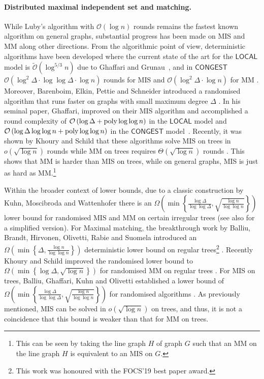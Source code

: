 \documentclass[letterpaper,11pt]{article}
\newcommand{\poly}{\operatorname{\text{{\rm poly}}}}
\newcommand{\1}{\mathbb I}
\newcommand{\bigO}{\mathcal{O}}
\newcommand{\CONGEST}{\ensuremath{\mathsf{CONGEST}}\xspace}
\newcommand{\LOCAL}{\ensuremath{\mathsf{LOCAL}}\xspace}
\begin{document}
\paragraph{Distributed maximal independent set and matching.} 
%
While Luby's algorithm with $\bigO(\log n)$ rounds remains the fastest known algorithm on general graphs, substantial progress has been made on MIS and MM along other directions. From the algorithmic point of view, deterministic algorithms have been developed where the current state of the art for the \LOCAL model is $\tilde{\bigO}(\log^{5/3} n)$ due to Ghaffari and Grunau~\cite{GG24}, and in \CONGEST $\bigO(\log^2 \Delta\cdot \log\log \Delta \cdot \log n)$ rounds for MIS \cite{fggkr-soda-23} and $\bigO(\log^2\Delta \cdot \log n)$ for MM \cite{fischer2020improved}. Moreover, Barenboim, Elkin, Pettie and Schneider introduced a randomised algorithm that runs faster on graphs with small maximum degree $\Delta$ \cite{BEPS}. In his seminal paper, Ghaffari, improved on their MIS algorithm and accomplished a round complexity of $\bigO\left(\log \Delta + \poly\log\log n \right)$ in the \LOCAL model \cite{ghaffari-soda-16,RG20, GG24} and $\bigO\left(\log \Delta\log\log n + \poly\log\log n \right)$ in the \CONGEST model~\cite{G19}. Recently, it was shown by Khoury and Schild that these algorithms solve MIS on trees in $o\left(\sqrt{\log n}\right)$ rounds \cite{ks-stoc-26} while MM on trees requires $\Theta(\sqrt{\log n})$ rounds \cite{khoury2025round, BEPS, ghaffari-soda-16}. This shows that MM is harder than MIS on trees, while on general graphs, MIS is just as hard as MM.\footnote{This can be seen by taking the line graph $H$ of graph $G$ such that an MM on the line graph $H$ is equivalent to an MIS on $G$.} 

Within the broader context of lower bounds, due to a classic construction by Kuhn, Moscibroda and Wattenhofer there is an $\Omega\left(\min\left\{\frac{\log \Delta}{\log\log \Delta}, \sqrt{\frac{\log n}{\log\log n}} \right\}\right)$ lower bound for randomised MIS and MM on certain irregular trees \cite{kmw-jacm-2016} (see also \cite{Coupette2021} for a simplified version). For Maximal matching, the breakthrough work by Balliu, Brandt, Hirvonen, Olivetti, Rabie and Suomela introduced an $\Omega\left(\min\left\{\Delta, {\frac{\log n}{\log\log n}} \right\}\right)$ deterministic lower bound on regular trees\footnote{This work was honoured with the FOCS'19 best paper award.} \cite{bbhors-jacm-2019}. Recently  Khoury and Schild improved the randomised lower bound to $\Omega\left(\min\left\{\log \Delta, \sqrt{\log n} \right\}\right)$ for randomised MM on regular trees \cite{khoury2025round}. For MIS on trees, Balliu, Ghaffari, Kuhn and Olivetti established a lower bound of $\Omega\left(\min\left\{\frac{\log \Delta}{\log\log \Delta}, \sqrt{\frac{\log n}{\log\log n}} \right\}\right)$ for randomised algorithms \cite{bgko-podc-23}. As previously mentioned, MIS can be solved in $o(\sqrt{\log n})$ on trees, and thus, it is not a coincidence that this bound is weaker than that for MM on trees.
\end{document}
